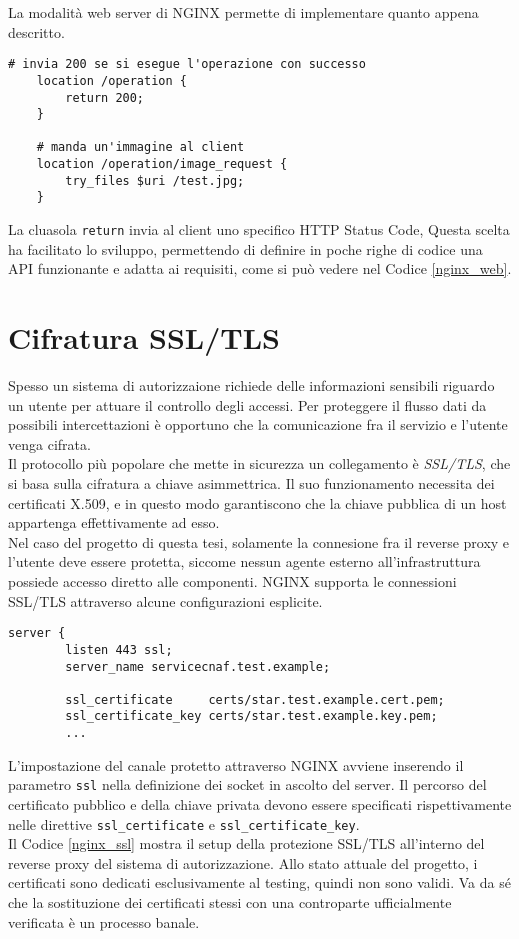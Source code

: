 La modalità web server di NGINX permette di implementare quanto appena descritto.
\lstset{language=nginx}
\begin{lstlisting}[caption={Frammento di codice dell'application server},captionpos=b,label=nginx_web]
    # invia 200 se si esegue l'operazione con successo
    location /operation {
        return 200;
    }

    # manda un'immagine al client
    location /operation/image_request {
        try_files $uri /test.jpg;
    }
\end{lstlisting}
La cluasola \texttt{return} invia al client uno specifico HTTP Status Code,  
Questa scelta ha facilitato lo sviluppo, permettendo di definire in poche righe di codice una API funzionante e adatta ai requisiti,  
come si può vedere nel Codice \ref*{nginx_web}.

\section{Cifratura SSL/TLS}
Spesso un sistema di autorizzaione richiede delle informazioni sensibili riguardo un utente per attuare il controllo 
degli accessi. 
Per proteggere il flusso dati da possibili intercettazioni è opportuno che la comunicazione fra il servizio e l'utente venga cifrata. 
\\ Il protocollo più popolare che mette in sicurezza un collegamento \newline è \textit{SSL/TLS}, che si basa sulla cifratura a chiave asimmettrica. Il suo funzionamento necessita 
dei certificati X.509, e in questo modo garantiscono che la chiave pubblica di un host appartenga effettivamente ad esso. 
\\ Nel caso del progetto di questa tesi, solamente la connesione fra il reverse proxy e l'utente deve essere protetta, siccome nessun agente esterno
 all'infrastruttura possiede accesso diretto alle componenti.
NGINX supporta le connessioni SSL/TLS attraverso alcune configurazioni esplicite.

\begin{lstlisting}[caption={Configurazione di SSL},captionpos=b,label=nginx_ssl]
    server {
        listen 443 ssl;
        server_name servicecnaf.test.example;
        
        ssl_certificate     certs/star.test.example.cert.pem;
        ssl_certificate_key certs/star.test.example.key.pem;
        ...
\end{lstlisting}
L'impostazione del canale protetto attraverso NGINX avviene inserendo il parametro \texttt{ssl} nella definizione 
dei socket in ascolto del server. Il percorso del certificato pubblico e della chiave privata devono essere specificati 
rispettivamente nelle direttive \texttt{ssl\_certificate} e \texttt{ssl\_certificate\_key}. \\
Il Codice \ref*{nginx_ssl} mostra il setup della protezione SSL/TLS all'interno del reverse proxy del sistema di autorizzazione.
Allo stato attuale del progetto, i certificati sono dedicati esclusivamente al testing, quindi non sono validi. Va da sé che 
la sostituzione dei certificati stessi
con una controparte ufficialmente verificata è un processo banale.  


